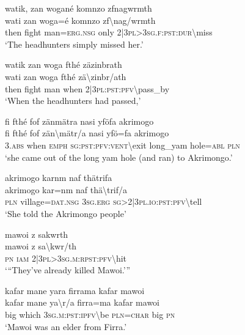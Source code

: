 \ea\label{ex:4:a1734}
watik, zan wogané komnzo zfnagwrmth\\
\gll wati	zan	woga=é	komnzo	zf{\textbackslash}nag/wrmth\\
     then	fight	man=\textsc{erg}.\textsc{nsg}	only	2|3\textsc{pl}>3\textsc{sg}.\textsc{f}:\textsc{pst}:\textsc{dur}{\textbackslash}miss\\
\glt `The headhunters simply missed her.'
\z

\ea\label{ex:4:a1735}
watik zan woga fthé zäzinbrath\\
\gll wati	zan	woga	fthé	zä{\textbackslash}zinbr/ath\\
     then	fight	man	when	2|3\textsc{pl}:\textsc{pst}:\textsc{pfv}{\textbackslash}pass\_by\\
\glt `When the headhunters had passed,'
\z

\ea\label{ex:4:a1737}
fi fthé fof zänmätra nasi yföfa akrimogo\\
\gll fi	fthé	fof	zän{\textbackslash}mätr/a	nasi	yfö=fa	akrimogo\\
     3.\textsc{abs}	when	\textsc{emph}	\textsc{sg}:\textsc{pst}:\textsc{pfv}:\textsc{vent}{\textbackslash}exit	long\_yam	hole=\textsc{abl}	\textsc{pln}\\
\glt `she came out of the long yam hole (and ran) to Akrimongo.'
\z

\ea\label{ex:4:a1738}
akrimogo karnm naf thätrifa\\
\gll akrimogo	kar=nm	naf	thä{\textbackslash}trif/a\\
     \textsc{pln}	village=\textsc{dat}.\textsc{nsg}	3\textsc{sg}.\textsc{erg}	\textsc{sg}>2|3\textsc{pl}.\textsc{io}:\textsc{pst}:\textsc{pfv}{\textbackslash}tell\\
\glt `She told the Akrimongo people'
\z

\ea\label{ex:4:a1739}
mawoi z sakwrth\\
\gll mawoi	z	sa{\textbackslash}kwr/th\\
     \textsc{pn}	\textsc{iam}	2|3\textsc{pl}>3\textsc{sg}.\textsc{m}:\textsc{rpst}:\textsc{pfv}{\textbackslash}hit\\
\glt `{``}They've already killed Mawoi.'''
\z

\ea\label{ex:4:a1740}
kafar mane yara firrama kafar mawoi\\
\gll kafar	mane	ya{\textbackslash}r/a	firra=ma	kafar	mawoi\\
     big	which	3\textsc{sg}.\textsc{m}:\textsc{pst}:\textsc{ipfv}{\textbackslash}be	\textsc{pln}=\textsc{char}	big	\textsc{pn}\\
\glt `Mawoi was an elder from Firra.'
\z

